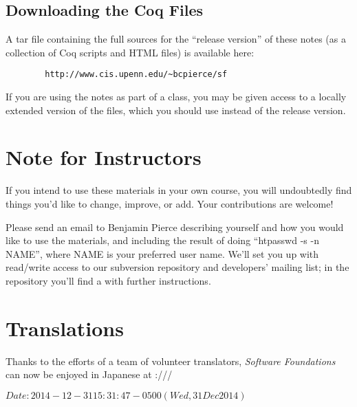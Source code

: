 \documentclass[12pt]{report}
\begin{document}
\subsection{Downloading the Coq Files}



 A tar file containing the full sources for the ``release version''
    of these notes (as a collection of Coq scripts and HTML files) is
    available here:
\begin{verbatim}
        http://www.cis.upenn.edu/~bcpierce/sf   
\end{verbatim}
    If you are using the notes as part of a class, you may be given
    access to a locally extended version of the files, which you
    should use instead of the release version.
\begin{coqdoccode}
\coqdocemptyline
\end{coqdoccode}
\section{Note for Instructors}



 If you intend to use these materials in your own course, you will
    undoubtedly find things you'd like to change, improve, or add.
    Your contributions are welcome!


    Please send an email to Benjamin Pierce describing yourself and
    how you would like to use the materials, and including the result
    of doing ``htpasswd -s -n NAME'', where NAME is your preferred user
    name.  We'll set you up with read/write access to our subversion
    repository and developers' mailing list; in the repository you'll
    find a  with further instructions. \begin{coqdoccode}
\coqdocemptyline
\end{coqdoccode}
\section{Translations}



 Thanks to the efforts of a team of volunteer translators, \textit{Software 
    Foundations} can now be enjoyed in Japanese at :///


 $Date: 2014-12-31 15:31:47 -0500 (Wed, 31 Dec 2014) $ \begin{coqdoccode}
\coqdocemptyline
\end{coqdoccode}
\end{document}
